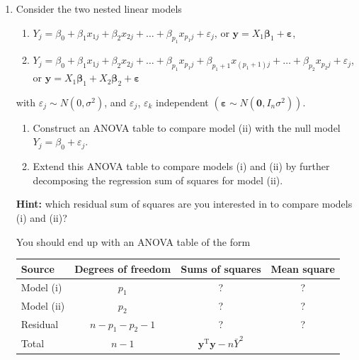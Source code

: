 \documentclass[
]{book}
\theoremstyle{definition}
\theoremstyle{definition}
\theoremstyle{definition}
\theoremstyle{definition}
\theoremstyle{remark}
\begin{document}
\begin{enumerate}
\def\labelenumi{\arabic{enumi}.}
\setcounter{enumi}{2}
\item
  Consider the two nested linear models

  \begin{enumerate}
  \def\labelenumii{(\roman{enumii})}
  \item
    \(Y_j = \beta_0 + \beta_1x_{1j} + \beta_2x_{2j} + \ldots + \beta_{p_1}x_{p_1j} + \varepsilon_j\), or \(\boldsymbol{y}= X_1\boldsymbol{\beta}_1 + \boldsymbol{\varepsilon}\),
  \item
    \(Y_j = \beta_0 + \beta_1x_{1j} + \beta_2x_{2j} + \ldots + \beta_{p_1}x_{p_1j} + \beta_{p_1+1}x_{(p_1+1)j} + \ldots + \beta_{p_2}x_{p_2j} + \varepsilon_j\), or \(\boldsymbol{y}= X_1\boldsymbol{\beta}_1 + X_2\boldsymbol{\beta}_2+ \boldsymbol{\varepsilon}\)
  \end{enumerate}

  with \(\varepsilon_j\sim N(0, \sigma^2)\), and \(\varepsilon_{j}\), \(\varepsilon_{k}\) independent \((\boldsymbol{\varepsilon}\sim N(\boldsymbol{0},I_n\sigma^2))\).

  \begin{enumerate}
  \def\labelenumii{\alph{enumii}.}
  \item
    Construct an ANOVA table to compare model (ii) with the null model \(Y_j=\beta_0 + \varepsilon_j\).
  \item
    Extend this ANOVA table to compare models (i) and (ii) by further decomposing the regression sum of squares for model (ii).
  \end{enumerate}

  \textbf{Hint:} which residual sum of squares are you interested in to compare models (i) and (ii)?

  You should end up with an ANOVA table of the form

  \begin{longtable}[]{@{}lccc@{}}
  \toprule
  Source & Degrees of freedom & Sums of squares & Mean square \\
  \midrule
  \endhead
  Model (i) & \(p_1\) & ? & ? \\
  Model (ii) & \(p_2\) & ? & ? \\
  Residual & \(n-p_1-p_2-1\) & ? & ? \\
  Total & \(n-1\) & \(\boldsymbol{y}^{\mathrm{T}}\boldsymbol{y}- n\bar{Y}^2\) & \\
  \bottomrule
  \end{longtable}


\end{enumerate}
\end{document}
